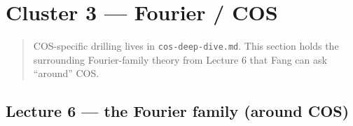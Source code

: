 \documentclass[
  11pt,
]{article}
\begin{document}
\hypertarget{cluster-3-fourier-cos}{%
\section{Cluster 3 --- Fourier / COS}\label{cluster-3-fourier-cos}}

\begin{quote}
COS-specific drilling lives in \texttt{cos-deep-dive.md}. This section
holds the surrounding Fourier-family theory from Lecture 6 that Fang can
ask ``around'' COS.
\end{quote}

\hypertarget{lecture-6-the-fourier-family-around-cos}{%
\subsection{Lecture 6 --- the Fourier family (around
COS)}\label{lecture-6-the-fourier-family-around-cos}}
\end{document}
